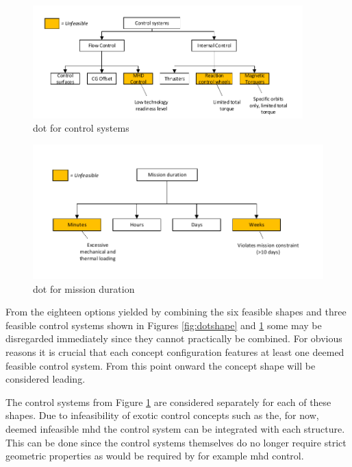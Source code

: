 \begin{figure}[H]
\centering
\includegraphics[width = 0.93\textwidth]{Figure/DOT_control.pdf}
\vspace{-5mm}
\caption{\acrfull{dot} for control systems}
\label{fig:dotcontrol}
\end{figure}

\begin{figure}[H]
\centering
\includegraphics[width = 1.0\textwidth]{Figure/DOT_missionduration.pdf}
\vspace{-5mm}
\caption{\acrfull{dot} for mission duration}
\label{fig:dotduration}
\end{figure}

From the eighteen options yielded by combining the six feasible shapes and three feasible control systems shown in Figures \ref{fig:dotshape} and \ref{fig:dotcontrol} some may be disregarded immediately since they cannot practically be combined. For obvious reasons it is crucial that each concept configuration features at least one deemed feasible control system. From this point onward the concept shape will be considered leading. 

The control systems from Figure  \ref{fig:dotcontrol} are considered separately for each of these shapes. Due to infeasibility of exotic control concepts such as the, for now, deemed infeasible \gls{mhd} the control system can be integrated with each structure. This can be done since the control systems themselves do no longer require strict geometric properties as would be required by for example \gls{mhd} control.

